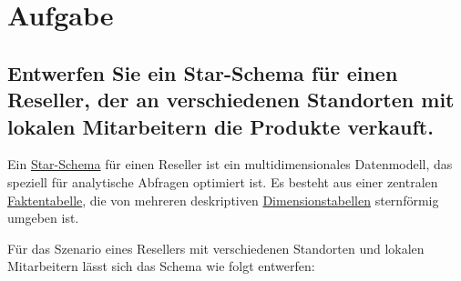 
\chapter{Aufgabe}
\label{chap:2 Aufgabe}
\thispagestyle{fancy}
\section*{Entwerfen Sie ein Star-Schema für einen Reseller, der an verschiedenen Standorten mit lokalen Mitarbeitern die Produkte verkauft.} \par Ein \uline{Star-Schema} für einen Reseller ist ein multidimensionales Datenmodell, das speziell für analytische Abfragen optimiert ist. \cite{58}\cite{59}\cite{60}\cite{61} Es besteht aus einer zentralen \uline{Faktentabelle}, die von mehreren deskriptiven \uline{Dimensionstabellen} sternförmig umgeben ist. \cite{60}\cite{61} \par Für das Szenario eines Resellers mit verschiedenen Standorten und lokalen Mitarbeitern lässt sich das Schema wie folgt entwerfen:

